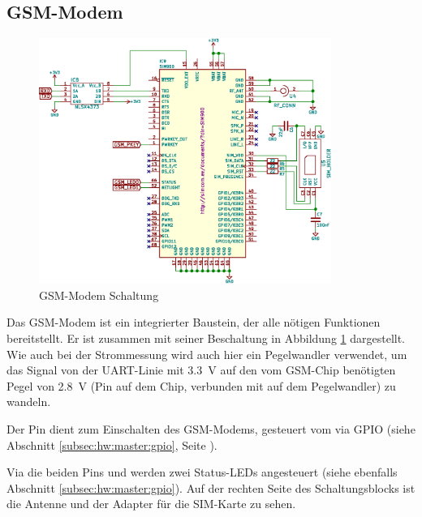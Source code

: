 \clearpage
\subsection{GSM-Modem}
\label{subsec:hw:master:gsm}

\begin{figure}[h!t]
    \centering
    \includegraphics[width=0.85\textwidth]{images/superv-sch/supervisor--sch--gsm.eps}
    \caption{GSM-Modem Schaltung}
    \label{fig:sch:master:gsm}
\end{figure}


Das GSM-Modem  ist ein  integrierter Baustein,  der alle  n\"otigen Funktionen
bereitstellt.    Er  ist   zusammen  mit   seiner  Beschaltung   in  Abbildung
\ref{fig:sch:master:gsm} dargestellt. Wie auch bei  der Strommessung wird auch
hier  ein  Pegelwandler  verwendet,  um  das Signal  von  der  UART-Linie  mit
\SI{3.3}{\volt} auf  den vom  GSM-Chip ben\"otigten Pegel  von \SI{2.8}{\volt}
(Pin    auf  dem  Chip, verbunden  mit    auf  dem
Pegelwandler) zu wandeln.

Der  Pin   dient  zum  Einschalten  des GSM-Modems,  gesteuert
vom  \Raspi  via  GPIO  (siehe  Abschnitt  \ref{subsec:hw:master:gpio},  Seite
\pageref{subsec:hw:master:gpio}).

Via die beiden Pins   und  werden zwei Status-LEDs
angesteuert (siehe  ebenfalls Abschnitt  \ref{subsec:hw:master:gpio}). Auf der
rechten Seite des  Schaltungsblocks ist die Antenne und der  Adapter f\"ur die
SIM-Karte zu sehen.
